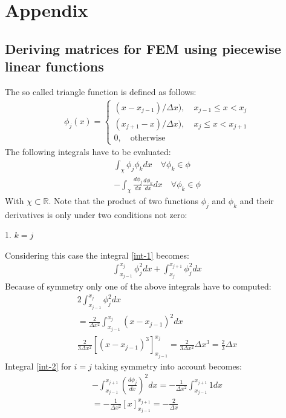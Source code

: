 \chapter{Appendix}
\section{Deriving matrices for FEM using piecewise linear functions} \label{ap-mat-der}
The so called triangle function is defined as follows:
\begin{gather}
    \phi_j(x)= 
\begin{cases}
    (x - x_{j-1}) / \Delta x), \quad x_{j-1} \leq x <  x_{j}\\
    (x_{j+1} - x) / \Delta x), \quad x_{j} \leq x <  x_{j + 1}\\
    0,              \quad \text{otherwise}
\end{cases}
\end{gather}
\cite{Gustafsson2011d}
The following integrals have to be evaluated:
\begin{gather}
\int_{\chi} \phi_{j}\phi_{k}dx \quad \forall \phi_{k} \in \phi   \label{int-1} \\
-\int_{\chi} \frac{d\phi_{j}}{dx}\frac{d\phi_{k}}{dx}dx  \quad \forall \phi_{k} \in \phi  \label{int-2}
\end{gather}
With \(\chi \subset \mathbb{R}\). 
Note that the product of two functions \(\phi_j\) and \(\phi_k\) and their derivatives is only under two conditions not zero:

1. \(k = j\)

Considering this case the integral  \ref{int-1} becomes:
\begin{gather}
\int_{x_{j-1}}^{x_{j}} \phi_j^{2} dx + \int_{x_{j}}^{x_{j+1}} \phi_j^{2} dx 
\end{gather}
Because of symmetry only one of the above integrals have to computed:
\begin{gather}
2 \int_{x_{j-1}}^{x_{j}} \phi_j^{2} dx \\
= \frac{2}{\Delta x^2} \int_{x_{j-1}}^{x_{j}} (x-x_{j-1})^{2} dx \\
\frac{2}{3 \Delta x^{2}} \left[ (x - x_{j-1})^3\right]_{x_{j-1}}^{{x_j}} = \frac{2}{3 \Delta x^{2}} \Delta x^3 = \frac{2}{3}\Delta x
\end{gather}
Integral \ref{int-2} for \(i = j\) taking symmetry into account becomes:
\begin{gather}
-\int_{x_{j-1}}^{x_{j+1}} (\frac{d \phi_j}{dx})^2 dx = -\frac{1}{\Delta x^2} \int_{x_{j-1}}^{x_{j+1}} 1 dx\\
 = -\frac{1}{\Delta x^2}  \left[ x \right]_{x_{j-1}}^{x_{j+1}} = -\frac{2}{\Delta x}
\end{gather}

